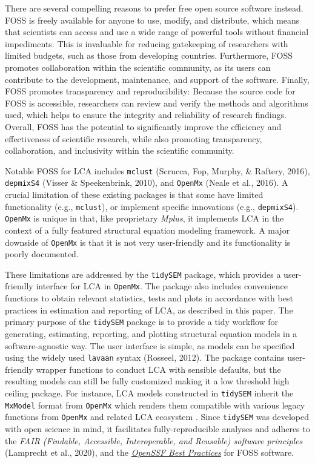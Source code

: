 \documentclass[
  ,man,floatsintext]{apa6}
\begin{document}
There are several compelling reasons to prefer free open source software instead.
FOSS is freely available for anyone to use, modify, and distribute, which means that scientists can access and use a wide range of powerful tools without financial impediments.
This is invaluable for reducing gatekeeping of researchers with limited budgets, such as those from developing countries.
Furthermore, FOSS promotes collaboration within the scientific community,
as its users can contribute to the development, maintenance, and support of the software.
Finally, FOSS promotes transparency and reproducibility: Because the source code for FOSS is accessible,
researchers can review and verify the methods and algorithms used,
which helps to ensure the integrity and reliability of research findings.
Overall, FOSS has the potential to significantly improve the efficiency and effectiveness of scientific research, while also promoting transparency, collaboration, and inclusivity within the scientific community.

Notable FOSS for LCA includes \texttt{mclust} (Scrucca, Fop, Murphy, \& Raftery, 2016), \texttt{depmixS4} (Visser \& Speekenbrink, 2010), and \texttt{OpenMx} (Neale et al., 2016).
A crucial limitation of these existing packages is that some have limited functionality (e.g., \texttt{mclust}),
or implement specific innovations (e.g., \texttt{depmixS4}).
\texttt{OpenMx} is unique in that, like proprietary \emph{Mplus}, it implements LCA in the context of a fully featured structural equation modeling framework.
A major downside of \texttt{OpenMx} is that it is not very user-friendly and its functionality is poorly documented.

These limitations are addressed by the \texttt{tidySEM} package,
which provides a user-friendly interface for LCA in \texttt{OpenMx}.
The package also includes convenience functions to obtain relevant statistics, tests and plots in accordance with best practices in estimation and reporting of LCA, as described in this paper.
The primary purpose of the \texttt{tidySEM} package is to provide a tidy workflow for generating, estimating, reporting, and plotting structural equation models in a software-agnostic way.
The user interface is simple, as models can be specified using the widely used \texttt{lavaan} syntax (Rosseel, 2012).
The package contains user-friendly wrapper functions to conduct LCA with sensible defaults,
but the resulting models can still be fully customized making it a low threshold high ceiling package.
For instance, LCA models constructed in \texttt{tidySEM} inherit the \texttt{MxModel} format from \texttt{OpenMx} which renders them compatible with various legacy functions from \texttt{OpenMx} and related LCA ecosystem .
Since \texttt{tidySEM} was developed with open science in mind, it facilitates fully-reproducible analyses and adheres to the \emph{FAIR (Findable, Accessible, Interoperable, and Reusable) software principles} (Lamprecht et al., 2020),
and the \href{https://bestpractices.coreinfrastructure.org/en/criteria}{\emph{OpenSSF Best Practices}} for FOSS software.
\end{document}
